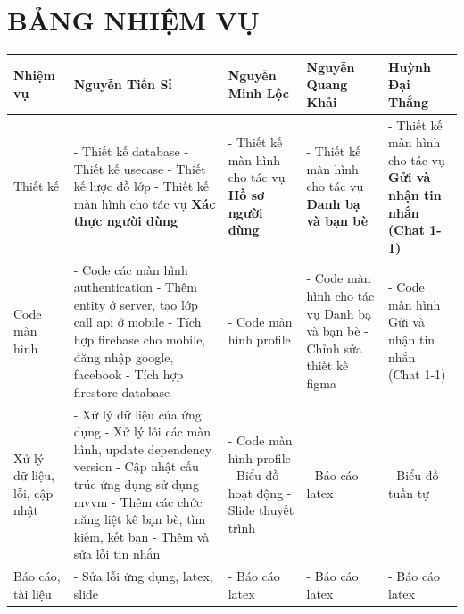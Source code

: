 \documentclass[12pt,a4paper]{article}
\begin{document}
	\section*{BẢNG NHIỆM VỤ}
	\vfill
	\renewcommand{\arraystretch}{1.2}
	\setlength{\tabcolsep}{3pt}
	\begin{tabularx}{\textwidth}{|>{\raggedright\arraybackslash}p{2.5cm}|>{\raggedright\arraybackslash}p{3.2cm}|>{\raggedright\arraybackslash}p{3.2cm}|>{\raggedright\arraybackslash}p{3.2cm}|>{\raggedright\arraybackslash}p{3.2cm}|}
		\hline
		\rowcolor[HTML]{C6EFCE}
		\textbf{Nhiệm vụ} & \textbf{Nguyễn Tiến Sỉ} & \textbf{Nguyễn Minh Lộc} & \textbf{Nguyễn Quang Khải} & \textbf{Huỳnh Đại Thắng} \\
		\hline
		Thiết kế & 
		- Thiết kế database \newline
		- Thiết kế usecase \newline
		- Thiết kế lược đồ lớp \newline
		- Thiết kế màn hình cho tác vụ \textbf{Xác thực người dùng}
		&
		- Thiết kế màn hình cho tác vụ \textbf{Hồ sơ người dùng}
		&
		- Thiết kế màn hình cho tác vụ \textbf{Danh bạ và bạn bè}
		&
		- Thiết kế màn hình cho tác vụ \textbf{Gửi và nhận tin nhắn (Chat 1-1)}
		\\
		\hline
		Code màn hình &
		- Code các màn hình authentication \newline
		- Thêm entity ở server, tạo lớp call api ở mobile \newline
		- Tích hợp firebase cho mobile, đăng nhập google, facebook \newline
		- Tích hợp firestore database
		&
		- Code màn hình profile
		&
		- Code màn hình cho tác vụ Danh bạ và bạn bè \newline
		- Chỉnh sửa thiết kế figma
		&
		- Code màn hình Gửi và nhận tin nhắn (Chat 1-1)
		\\
		\hline
		Xử lý dữ liệu, lỗi, cập nhật &
		- Xử lý dữ liệu của ứng dụng \newline
		- Xử lý lỗi các màn hình, update dependency version \newline
		- Cập nhật cấu trúc ứng dụng sử dụng mvvm \newline
		- Thêm các chức năng liệt kê bạn bè, tìm kiếm, kết bạn \newline
		- Thêm và sửa lỗi tin nhắn
		&
		- Code màn hình profile \newline
		- Biểu đồ hoạt động \newline
		- Slide thuyết trình
		&
		- Báo cáo latex
		&
		- Biểu đồ tuần tự
		\\
		\hline
		Báo cáo, tài liệu &
		- Sửa lỗi ứng dụng, latex, slide
		&
		- Báo cáo latex
		&
		- Báo cáo latex
		&
		- Báo cáo latex
		\\
		\hline
	\end{tabularx}
	\vfill
\end{document}

